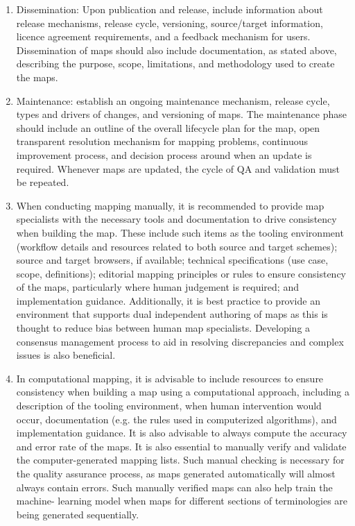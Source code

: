 \begin{enumerate}
\item Dissemination: Upon publication and release, include information about release
mechanisms, release cycle, versioning, source/target information, licence
agreement requirements, and a feedback mechanism for users. Dissemination of
maps should also include documentation, as stated above, describing the
purpose, scope, limitations, and methodology used to create the maps.
\item Maintenance: establish an ongoing maintenance mechanism, release cycle, types
and drivers of changes, and versioning of maps. The maintenance phase should
include an outline of the overall lifecycle plan for the map, open transparent
resolution mechanism for mapping problems, continuous improvement process,
and decision process around when an update is required. Whenever maps are
updated, the cycle of QA and validation must be repeated.
\item When conducting mapping manually, it is recommended to provide map
specialists with the necessary tools and documentation to drive consistency when
building the map. These include such items as the tooling environment (workflow
details and resources related to both source and target schemes); source and
target browsers, if available; technical specifications (use case, scope, definitions);
editorial mapping principles or rules to ensure consistency of the maps,
particularly where human judgement is required; and implementation guidance.
Additionally, it is best practice to provide an environment that supports dual
independent authoring of maps as this is thought to reduce bias between human
map specialists. Developing a consensus management process to aid in resolving
discrepancies and complex issues is also beneficial.
\item In computational mapping, it is advisable to include resources to ensure
consistency when building a map using a computational approach, including a
description of the tooling environment, when human intervention would occur,
documentation (e.g. the rules used in computerized algorithms), and
implementation guidance. It is also advisable to always compute the accuracy
and error rate of the maps. It is also essential to manually verify and validate the
computer-generated mapping lists. Such manual checking is necessary for the
quality assurance process, as maps generated automatically will almost always
contain errors. Such manually verified maps can also help train the machine-
learning model when maps for different sections of terminologies are being
generated sequentially.

\end{enumerate}
